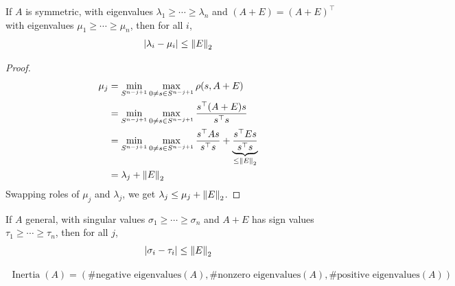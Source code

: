 \documentclass[11pt]{article}
\numberwithin{equation}{section}
\begin{document}
\begin{theorem}\label{thm:Weyl}
    If $A$ is symmetric, with eigenvalues $\lambda_1 \geq \cdots \geq \lambda_n$ and $(A+E)=(A+E)^\top$ with eigenvalues $\mu_1 \geq \cdots \geq \mu_n$, then for all $i$,\begin{align*}
        |\lambda_i - \mu_i| \leq \left\| E \right\|_2
    \end{align*}
    \begin{proof}
        \begin{align*}
            \mu_j &= \min_{S^{n-j+1}} \max_{0 \neq s \in S^{n-j+1}} \rho(s, A+E) \\
            &= \min_{S^{n-j+1}} \max_{0 \neq s \in S^{n-j+1}} \frac{s^\top (A+E)s}{s^\top s} \\
            &= \min_{S^{n-j+1}} \max_{0 \neq s \in S^{n-j+1}} \frac{s^\top As}{s^\top s} + \underbrace{\frac{s^\top Es}{s^\top s}}_{\leq \left\| E \right\|_2} \\
            &= \lambda_j + \left\| E \right\|_2
        \end{align*}
        Swapping roles of $\mu_j$ and $\lambda_j$, we get $\lambda_j \leq \mu_j + \left\| E \right\|_2$.
    \end{proof}
\end{theorem}

\begin{corollary}
    If $A$ general, with singular values $\sigma_1 \geq \cdots \geq \sigma_n$ and $A+E$ has sign values $\tau_1 \geq \cdots \geq \tau_n$, then for all $j$,\begin{align*}
        |\sigma_i - \tau_i| \leq \left\| E \right\|_2
    \end{align*}
\end{corollary}

\begin{definition}
    \begin{align*}
        \operatorname{Inertia}(A) = (\#\text{negative eigenvalues}(A), \#\text{nonzero eigenvalues}(A), \#\text{positive eigenvalues}(A))
    \end{align*}
\end{definition}
\end{document}
